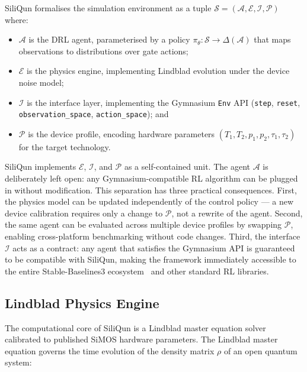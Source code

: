 SiliQun formalises the simulation environment as a tuple $\mathcal{S} = (\mathcal{A}, \mathcal{E}, \mathcal{I}, \mathcal{P})$ where:

\begin{itemize}
  \item $\mathcal{A}$ is the DRL agent, parameterised by a policy $\pi_\theta: \mathcal{S} \rightarrow \Delta(\mathcal{A})$ that maps observations to distributions over gate actions;
  \item $\mathcal{E}$ is the physics engine, implementing Lindblad evolution under the device noise model;
  \item $\mathcal{I}$ is the interface layer, implementing the Gymnasium \texttt{Env} API (\texttt{step}, \texttt{reset}, \texttt{observation\_space}, \texttt{action\_space}); and
  \item $\mathcal{P}$ is the device profile, encoding hardware parameters $(T_1, T_2, p_1, p_2, \tau_1, \tau_2)$ for the target technology.
\end{itemize}

SiliQun implements $\mathcal{E}$, $\mathcal{I}$, and $\mathcal{P}$ as a self-contained unit. The agent $\mathcal{A}$ is deliberately left open: any Gymnasium-compatible RL algorithm can be plugged in without modification. This separation has three practical consequences. First, the physics model can be updated independently of the control policy — a new device calibration requires only a change to $\mathcal{P}$, not a rewrite of the agent. Second, the same agent can be evaluated across multiple device profiles by swapping $\mathcal{P}$, enabling cross-platform benchmarking without code changes. Third, the interface $\mathcal{I}$ acts as a contract: any agent that satisfies the Gymnasium API is guaranteed to be compatible with SiliQun, making the framework immediately accessible to the entire Stable-Baselines3 ecosystem~\cite{Raffin2021} and other standard RL libraries.

\subsection{Lindblad Physics Engine}
\label{subsec:lindblad}

The computational core of SiliQun is a Lindblad master equation solver calibrated to published SiMOS hardware parameters. The Lindblad master equation governs the time evolution of the density matrix $\rho$ of an open quantum system:

